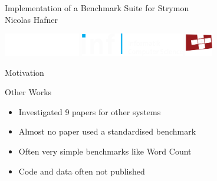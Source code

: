 \documentclass[14pt,t]{beamer}
\renewcommand{\title}[1]{
  {\huge #1} \vskip 0.4cm
}
\begin{document}
\begin{frame}[b]
  \begin{center}
    {\LARGE Implementation of a Benchmark Suite for Strymon} \\
    \vspace{0.5cm}
    Nicolas Hafner \\
    \vfill
    \hspace*{-1cm}\begin{minipage}{\pagewidth}
      \begin{center}
        \hspace{0.5cm}
        \includegraphics[height=1cm]{../systems-cover/ethlogo_white.pdf}
        \hfill
        \includegraphics[height=1cm]{../systems-cover/inf-logo_white.pdf}
        \hfill
        \includegraphics[height=1cm]{../systems-cover/systemslogo-3colour_white.pdf}
        \hspace*{0.5cm}
      \end{center}
    \end{minipage} 
  \end{center}
\end{frame}

\begin{frame}
  \title{Motivation}
\end{frame}

\begin{frame}
  \title{Other Works}
  \begin{itemize}
  \item Investigated 9 papers for other systems
  \item Almost no paper used a standardised benchmark
  \item Often very simple benchmarks like Word Count
  \item Code and data often not published
  \end{itemize}
\end{frame}
\end{document}
